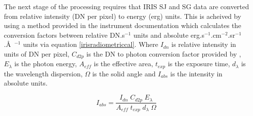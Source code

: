 \documentclass[11pt]{article}
\begin{document}
The next stage of the processing requires that IRIS SJ and SG data are converted from relative intensity (DN per pixel) to energy (erg) units. This is acheived by using a method provided in the instrument documentation \citep{2014SoPh..289.2733D} which calculates the conversion factors between relative DN.s$^{-1}$ units and absolute erg.s$^{-1}$.cm$^{-2}$.sr$^{-1}$.\AA\ $^{-1}$ units via equation \ref{irisradiometriccal}. Where $I_{dn}$ is relative intensity in units of DN per pixel, $C_{d2p}$ is the DN to photon conversion factor provided by \cite{2014SoPh..289.2733D}, $E_{\lambda}$ is the photon energy, $A_{eff}$ is the effective area, $t_{exp}$ is the exposure time, $d_{\lambda}$ is the wavelength dispersion, $\Omega$ is the solid angle and $I_{abs}$ is the intensity in absolute units.

\begin{equation}\label{irisradiometriccal}
I_{abs} = \frac{{I_{dn}} \; {C_{d2p}} \; {E_{\lambda}}}{{A_{eff}} \; {t_{exp}} \; {d_{\lambda}} \; {\Omega}}
\end{equation}
\end{document}
